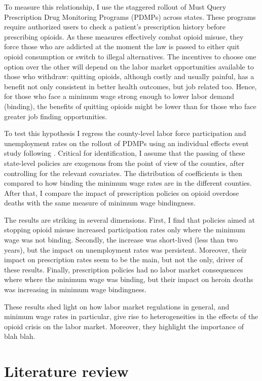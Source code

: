 \documentclass[12pt,a4paper]{article}
\begin{document}
To measure this relationship, I use the staggered rollout of Must Query Prescription Drug Monitoring Programs (PDMPs) across states.
These programs require authorized users to check a patient's prescription history before prescribing opioids.
As these measures effectively combat opioid misuse, they force those who are addicted at the moment the law is passed to either quit opioid consumption or switch to illegal alternatives.
The incentives to choose one option over the other will depend on the labor market opportunities available to those who withdraw: quitting opioids, although costly and usually painful, has a benefit not only consistent in better health outcomes, but job related too.
Hence, for those who face a minimum wage strong enough to lower labor demand (binding), the benefits of quitting opioids might be lower than for those who face greater job finding opportunities.

To test this hypothesis I regress the county-level labor force participation and unemployment rates on the rollout of PDMPs using an individual effects event study following \textcite{arkhangelsky2024flexible}.
Critical for identification, I assume that the passing of these state-level policies are exogenous from the point of view of the counties, after controlling for the relevant covariates.
The distribution of coefficients is then compared to how binding the minimum wage rates are in the different counties.
After that, I compare the impact of prescription policies on opioid overdose deaths with the same measure of minimum wage bindingness.

The results are striking in several dimensions.
First, I find that policies aimed at stopping opioid misuse increased participation rates only where the minimum wage was not binding.
Secondly, the increase was short-lived (less than two years), but the impact on unemployment rates was persistent.
Moreover, their impact on prescription rates seem to be the main, but not the only, driver of these results.
Finally, prescription policies had no labor market consequences where where the minimum wage was binding, but their impact on heroin deaths was increasing in minimum wage bindingness.

These results shed light on how labor market regulations in general, and minimum wage rates in particular, give rise to heterogeneities in the effects of the opioid crisis on the labor market.
Moreover, they highlight the importance of blah blah.

\section*{Literature review}
\end{document}

